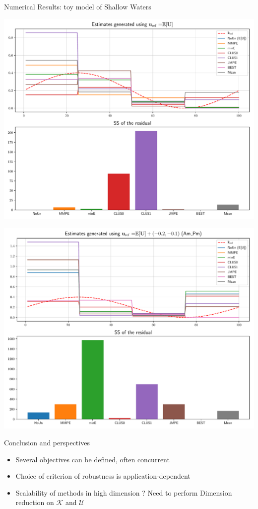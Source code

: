 \documentclass{beamer}
\newlength{\sndcolwid}
\begin{document}
\begin{frame}[t]
\begin{columns}[t]
\begin{column}{\sndcolwid}
\begin{block}{Numerical Results: toy model of Shallow Waters}
\begin{center}
    \includegraphics[width = .97\textwidth]{./estimate_uref_centered.pdf}
  \end{center}
  \begin{center}
    \includegraphics[width = .97\textwidth]{./estimate_uref_AmPm.pdf} 
  \end{center}
\end{block}
\vfill
\begin{block}{Conclusion and perspectives}
  \begin{itemize}
  \item Several objectives can be defined, often concurrent
  \item Choice of criterion of robustness is application-dependent
  \item Scalability of methods in high dimension ? Need to perform \alert{Dimension reduction} on $\mathcal{K}$ and  $\mathcal{U}$
  \end{itemize}
\end{block}


\end{column}
\end{columns}
\end{frame}
\end{document}
